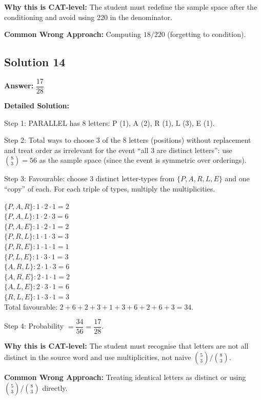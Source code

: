 \documentclass[11pt]{article}
\begin{document}
\textbf{Why this is CAT-level:} The student must redefine the sample space after the conditioning and avoid using 220 in the denominator.

\textbf{Common Wrong Approach:} Computing \( 18/220 \) (forgetting to condition).

\subsection*{Solution 14}
\textbf{Answer:} \( \dfrac{17}{28} \)

\textbf{Detailed Solution:}

Step 1: PARALLEL has 8 letters: P (1), A (2), R (1), L (3), E (1).

Step 2: Total ways to choose 3 of the 8 letters (positions) without replacement and treat order as irrelevant for the event ``all 3 are distinct letters'': use \( \binom{8}{3} = 56 \) as the sample space (since the event is symmetric over orderings).

Step 3: Favourable: choose 3 distinct letter-types from \( \{P, A, R, L, E\} \) and one ``copy'' of each. For each triple of types, multiply the multiplicities.

\( \{P,A,R\}: 1 \cdot 2 \cdot 1 = 2 \) \\
\( \{P,A,L\}: 1 \cdot 2 \cdot 3 = 6 \) \\
\( \{P,A,E\}: 1 \cdot 2 \cdot 1 = 2 \) \\
\( \{P,R,L\}: 1 \cdot 1 \cdot 3 = 3 \) \\
\( \{P,R,E\}: 1 \cdot 1 \cdot 1 = 1 \) \\
\( \{P,L,E\}: 1 \cdot 3 \cdot 1 = 3 \) \\
\( \{A,R,L\}: 2 \cdot 1 \cdot 3 = 6 \) \\
\( \{A,R,E\}: 2 \cdot 1 \cdot 1 = 2 \) \\
\( \{A,L,E\}: 2 \cdot 3 \cdot 1 = 6 \) \\
\( \{R,L,E\}: 1 \cdot 3 \cdot 1 = 3 \) \\
Total favourable: \( 2+6+2+3+1+3+6+2+6+3 = 34 \).

Step 4: Probability \( = \dfrac{34}{56} = \dfrac{17}{28} \).

\textbf{Why this is CAT-level:} The student must recognise that letters are not all distinct in the source word and use multiplicities, not naive \( \binom{5}{3}/\binom{8}{3} \).

\textbf{Common Wrong Approach:} Treating identical letters as distinct or using \( \binom{5}{3}/\binom{8}{3} \) directly.
\end{document}
